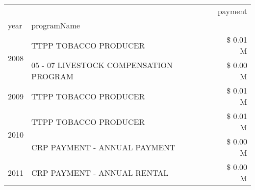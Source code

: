 \begin{tabular}{llr}
\toprule
 &  & payment \\
year & programName &  \\
\midrule
\multirow[t]{2}{*}{2008} & TTPP TOBACCO PRODUCER & \$ 0.01 M \\
 & 05 - 07 LIVESTOCK COMPENSATION PROGRAM & \$ 0.00 M \\
\cline{1-3}
2009 & TTPP TOBACCO PRODUCER & \$ 0.01 M \\
\cline{1-3}
\multirow[t]{2}{*}{2010} & TTPP TOBACCO PRODUCER & \$ 0.01 M \\
 & CRP PAYMENT - ANNUAL PAYMENT & \$ 0.00 M \\
\cline{1-3}
2011 & CRP PAYMENT - ANNUAL RENTAL & \$ 0.00 M \\
\cline{1-3}
\bottomrule
\end{tabular}
